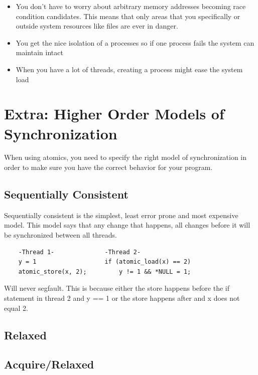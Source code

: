\begin{itemize}
\tightlist
\item
  You don't have to worry about arbitrary memory addresses becoming race condition candidates. This means that only areas that you specifically  or outside system resources like files are ever in danger.
\item
  You get the nice isolation of a processes so if one process fails the system can maintain intact
\item
  When you have a lot of threads, creating a process might ease the system load
\end{itemize}

\section{Extra: Higher Order Models of Synchronization}

When using atomics, you need to specify the right model of synchronization in order to make sure you have the correct behavior for your program.

\subsection{Sequentially Consistent}

Sequentially consistent is the simplest, least error prone and most expensive model. This model says that any change that happens, all changes before it will be synchronized between all threads.

\begin{verbatim}
    -Thread 1-              -Thread 2-
    y = 1                   if (atomic_load(x) == 2)
    atomic_store(x, 2);         y != 1 && *NULL = 1;
\end{verbatim}

Will never segfault. This is because either the store happens before the if statement in thread 2 and y == 1 or the store happens after and x does not equal 2.

\subsection{Relaxed}


\subsection{Acquire/Relaxed}

